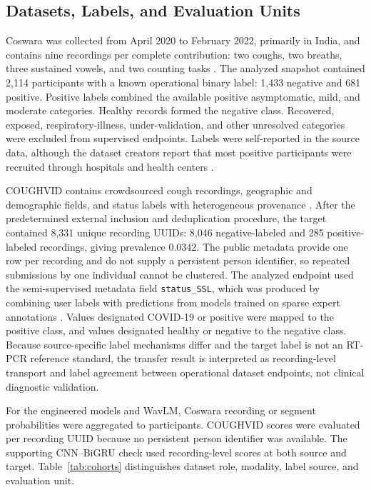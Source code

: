 \documentclass[journal]{IEEEtran}
\begin{document}
\subsection{Datasets, Labels, and Evaluation Units}

Coswara was collected from April 2020 to February 2022, primarily in India, and contains nine recordings per complete contribution: two coughs, two breaths, three sustained vowels, and two counting tasks \cite{bhattacharya2023coswara}. The analyzed snapshot contained 2,114 participants with a known operational binary label: 1,433 negative and 681 positive. Positive labels combined the available positive asymptomatic, mild, and moderate categories. Healthy records formed the negative class. Recovered, exposed, respiratory-illness, under-validation, and other unresolved categories were excluded from supervised endpoints. Labels were self-reported in the source data, although the dataset creators report that most positive participants were recruited through hospitals and health centers \cite{bhattacharya2023coswara}.

COUGHVID contains crowdsourced cough recordings, geographic and demographic fields, and status labels with heterogeneous provenance \cite{orlandic2021coughvid}. After the predetermined external inclusion and deduplication procedure, the target contained 8,331 unique recording UUIDs: 8,046 negative-labeled and 285 positive-labeled recordings, giving prevalence 0.0342. The public metadata provide one row per recording and do not supply a persistent person identifier, so repeated submissions by one individual cannot be clustered. The analyzed endpoint used the semi-supervised metadata field \texttt{status\_SSL}, which was produced by combining user labels with predictions from models trained on sparse expert annotations \cite{orlandic2023semisupervised}. Values designated COVID-19 or positive were mapped to the positive class, and values designated healthy or negative to the negative class. Because source-specific label mechanisms differ and the target label is not an RT-PCR reference standard, the transfer result is interpreted as recording-level transport and label agreement between operational dataset endpoints, not clinical diagnostic validation.

For the engineered models and WavLM, Coswara recording or segment probabilities were aggregated to participants. COUGHVID scores were evaluated per recording UUID because no persistent person identifier was available. The supporting CNN--BiGRU check used recording-level scores at both source and target. Table~\ref{tab:cohorts} distinguishes dataset role, modality, label source, and evaluation unit.
\end{document}
